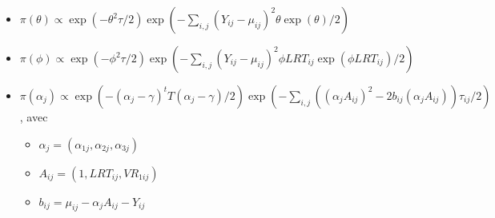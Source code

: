     \begin{itemize}
    
        \item $\pi(\theta) \propto \exp(-\theta^2 \tau /2) \exp(-\sum_{i,j}(Y_{ij} - \mu_{ij})^2 \theta \exp(\theta)/2)$



        \item $\pi(\phi) \propto \exp(-\phi^2 \tau /2) \exp(-\sum_{i,j}(Y_{ij} - \mu_{ij})^2 \phi LRT_{ij} \exp(\phi LRT_{ij})/2)$


        \item $\pi(\alpha_j) \propto \exp(-(\alpha_j - \gamma)^t T (\alpha_j - \gamma)/2) \exp(-\sum_{i,j}((\alpha_j A_{ij})^2 -2b_{ij}(\alpha_j A_{ij})) \tau_{ij}/2)$, avec
        \begin{itemize}
            \item $\alpha_j = (\alpha_{1j}, \alpha_{2j}, \alpha_{3j})$
            \item $A_{ij} = (1, LRT_{ij}, VR_{1ij})$
            \item $b_{ij} = \mu_{ij} - \alpha_j A_{ij} - Y_{ij}$
        \end{itemize}
        
    \end{itemize}
